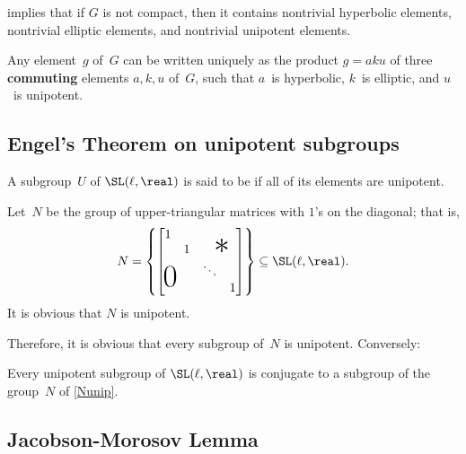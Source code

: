  \begin{rem}
  implies that if $G$ is not compact, then it contains nontrivial hyperbolic elements, nontrivial elliptic elements, and nontrivial unipotent elements.
\end{rem}

\begin{prop} \label{RealJordanDecomp} 
 Any element~$g$ of~$G$ can be written uniquely
as the product $g = aku$ of three \textbf{commuting} elements
$a,k,u$ of~$G$, such that $a$~is hyperbolic, $k$~is elliptic,
and $u$~is unipotent.
 \end{prop}


\subsection{Engel's Theorem on unipotent subgroups}

\begin{defn} \label{unipDefn}
A subgroup~$U$ of $\SL(\ell,\real)$ is said to be  if all of its elements are unipotent.
\end{defn}

\begin{eg} \label{Nunip}
Let~$N$ be the group of upper-triangular matrices with $1$'s on the diagonal; that is,
	$$N = \left\{
 	 \begin{bmatrix}
 	1 \\
 	 & 1 &  \vbox to 0pt{\vss \hbox to 0pt{\ \Huge $*$\hss}} \\
 	 &  \vbox to 0pt{\vss\hbox to 0pt{\hss\Huge $0$\ }\vss} & \ddots \\
  	& & & 1
  	\end{bmatrix}
  	\right\}
	\subseteq \SL(\ell,\real) 
	. $$
It is obvious that $N$ is unipotent.
\end{eg}

Therefore, it is obvious that every subgroup of~$N$ is unipotent. Conversely:

\begin{thm} \label{EngelUnip}
Every unipotent subgroup of\/ $\SL(\ell,\real)$ is conjugate to a subgroup of the group~$N$ of \cref{Nunip}.
\end{thm}


\subsection{Jacobson-Morosov Lemma}

